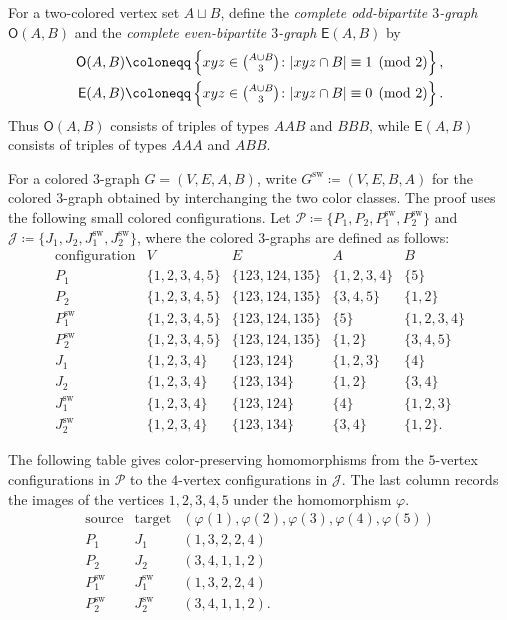 \documentclass[10pt,a4paper]{article}
\theoremstyle{plain}
\theoremstyle{definition}
\begin{document}
For a two-colored vertex set $A\sqcup B$, define the \emph{complete odd-bipartite $3$-graph} $\mathsf O(A,B)$ and the \emph{complete even-bipartite $3$-graph} $\mathsf E(A,B)$ by
\begin{align*}
\mathsf O(A,B) & \coloneqq\left\{xyz\in\tbinom{A\cup B}{3}\colon |xyz\cap B|\equiv 1\pmod 2\right\}, \\
\mathsf E(A,B) & \coloneqq\left\{xyz\in\tbinom{A\cup B}{3}\colon |xyz\cap B|\equiv 0\pmod 2\right\}.
\end{align*}
Thus $\mathsf O(A,B)$ consists of triples of types $AAB$ and $BBB$, while $\mathsf E(A,B)$ consists of triples of types $AAA$ and $ABB$.

For a colored $3$-graph $G=(V,E,A,B)$, write $G^{\mathrm{sw}}\coloneqq(V,E,B,A)$ for the colored $3$-graph obtained by interchanging the two color classes.
The proof uses the following small colored configurations.
Let $\mathcal P\coloneqq\{P_1,P_2,P_1^{\mathrm{sw}},P_2^{\mathrm{sw}}\}$ and $\mathcal J\coloneqq\{J_1,J_2,J_1^{\mathrm{sw}},J_2^{\mathrm{sw}}\}$, where the colored $3$-graphs are defined as follows:
\[
\begin{array}{c|c|c|c|c}
\text{configuration} & V & E & A & B\\ \hline
P_1 & \{1,2,3,4,5\} & \{123,124,135\} & \{1,2,3,4\} & \{5\}\\
P_2 & \{1,2,3,4,5\} & \{123,124,135\} & \{3,4,5\} & \{1,2\}\\
P_1^{\mathrm{sw}} & \{1,2,3,4,5\} & \{123,124,135\} & \{5\} & \{1,2,3,4\}\\
P_2^{\mathrm{sw}} & \{1,2,3,4,5\} & \{123,124,135\} & \{1,2\} & \{3,4,5\}\\
J_1 & \{1,2,3,4\} & \{123,124\} & \{1,2,3\} & \{4\}\\
J_2 & \{1,2,3,4\} & \{123,134\} & \{1,2\} & \{3,4\}\\
J_1^{\mathrm{sw}} & \{1,2,3,4\} & \{123,124\} & \{4\} & \{1,2,3\}\\
J_2^{\mathrm{sw}} & \{1,2,3,4\} & \{123,134\} & \{3,4\} & \{1,2\}.
\end{array}
\]



The following table gives color-preserving homomorphisms from the $5$-vertex configurations in $\mathcal P$ to the $4$-vertex configurations in $\mathcal J$.  The last column records the images of the vertices $1,2,3,4,5$ under the homomorphism $\varphi$. 
\[
\begin{array}{c|c|c}
\text{source} & \text{target} & (\varphi(1),\varphi(2),\varphi(3),\varphi(4),\varphi(5))\\ \hline
P_1 & J_1 & (1,3,2,2,4)\\
P_2 & J_2 & (3,4,1,1,2)\\
P_1^{\mathrm{sw}} & J_1^{\mathrm{sw}} & (1,3,2,2,4)\\
P_2^{\mathrm{sw}} & J_2^{\mathrm{sw}} & (3,4,1,1,2).
\end{array}
\]
\end{document}
